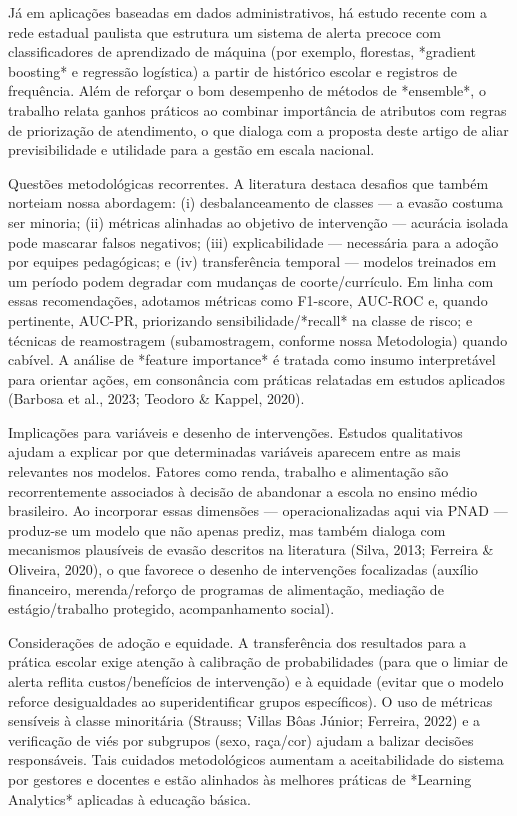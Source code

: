\documentclass[english, spanish, brazilian]{RBIEarticle} %
\begin{document}
Já em aplicações baseadas em dados administrativos, há estudo recente com a rede estadual
paulista que estrutura um sistema de alerta precoce com classificadores de aprendizado de máquina
(por exemplo, florestas, *gradient boosting* e regressão logística) a partir de histórico escolar e
registros de frequência. Além de reforçar o bom desempenho de métodos de *ensemble*, o trabalho
relata ganhos práticos ao combinar importância de atributos com regras de priorização de
atendimento, o que dialoga com a proposta deste artigo de aliar previsibilidade e utilidade para a
gestão em escala nacional.

Questões metodológicas recorrentes. A literatura destaca desafios que também norteiam nossa
abordagem: (i) desbalanceamento de classes — a evasão costuma ser minoria; (ii) métricas
alinhadas ao objetivo de intervenção — acurácia isolada pode mascarar falsos negativos; (iii)
explicabilidade — necessária para a adoção por equipes pedagógicas; e (iv) transferência temporal
— modelos treinados em um período podem degradar com mudanças de coorte/currículo. Em linha
com essas recomendações, adotamos métricas como F1-score, AUC-ROC e, quando pertinente,
AUC-PR, priorizando sensibilidade/*recall* na classe de risco; e técnicas de reamostragem
(subamostragem, conforme nossa Metodologia) quando cabível. A análise de *feature importance*
é tratada como insumo interpretável para orientar ações, em consonância com práticas relatadas em
estudos aplicados (Barbosa et al., 2023; Teodoro \& Kappel, 2020).

Implicações para variáveis e desenho de intervenções. Estudos qualitativos ajudam a explicar por
que determinadas variáveis aparecem entre as mais relevantes nos modelos. Fatores como renda,
trabalho e alimentação são recorrentemente associados à decisão de abandonar a escola no ensino
médio brasileiro. Ao incorporar essas dimensões — operacionalizadas aqui via PNAD — produz-se
um modelo que não apenas prediz, mas também dialoga com mecanismos plausíveis de evasão
descritos na literatura (Silva, 2013; Ferreira \& Oliveira, 2020), o que favorece o desenho de
intervenções focalizadas (auxílio financeiro, merenda/reforço de programas de alimentação,
mediação de estágio/trabalho protegido, acompanhamento social).

Considerações de adoção e equidade. A transferência dos resultados para a prática escolar exige
atenção à calibração de probabilidades (para que o limiar de alerta reflita custos/benefícios de
intervenção) e à equidade (evitar que o modelo reforce desigualdades ao superidentificar grupos
específicos). O uso de métricas sensíveis à classe minoritária (Strauss; Villas Bôas Júnior;
Ferreira, 2022) e a verificação de viés por subgrupos (sexo, raça/cor) ajudam a balizar decisões
responsáveis. Tais cuidados metodológicos aumentam a aceitabilidade do sistema por gestores e
docentes e estão alinhados às melhores práticas de *Learning Analytics* aplicadas à educação
básica.
\end{document}
